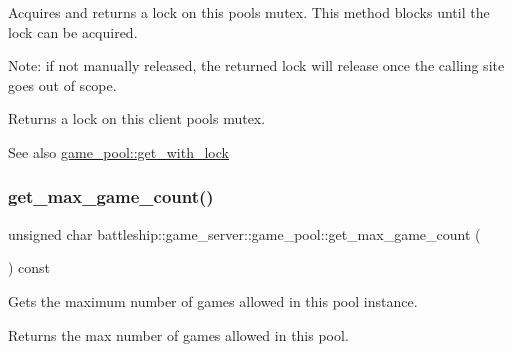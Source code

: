 Acquires and returns a lock on this pool\textquotesingle{}s mutex. This method blocks until the lock can be acquired.

Note\+: if not manually released, the returned lock will release once the calling site goes out of scope.

\begin{DoxyReturn}{Returns}
a lock on this client pool\textquotesingle{}s mutex.
\end{DoxyReturn}
\begin{DoxySeeAlso}{See also}
\hyperlink{classbattleship_1_1game__server_1_1game__pool_a47ebc8c0b2d4280ce0d02e0d808230e3}{game\+\_\+pool\+::get\+\_\+with\+\_\+lock} 
\end{DoxySeeAlso}
\mbox{\label{classbattleship_1_1game__server_1_1game__pool_a4082a1a43dc489fae1d537126c7024c5}} 
\subsubsection{\texorpdfstring{get\+\_\+max\+\_\+game\+\_\+count()}{get\_max\_game\_count()}}
{\footnotesize\ttfamily unsigned char battleship\+::game\+\_\+server\+::game\+\_\+pool\+::get\+\_\+max\+\_\+game\+\_\+count (\begin{DoxyParamCaption}{ }\end{DoxyParamCaption}) const\hspace{0.3cm}{\ttfamily [inline]}}

Gets the maximum number of games allowed in this pool instance. \begin{DoxyReturn}{Returns}
the max number of games allowed in this pool. 
\end{DoxyReturn}
\mbox{\label{classbattleship_1_1game__server_1_1game__pool_a47ebc8c0b2d4280ce0d02e0d808230e3}} 
